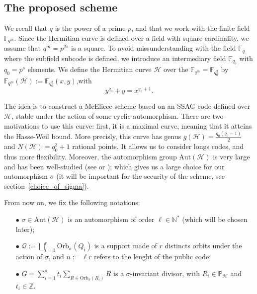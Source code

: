 \documentclass[10pt]{article}
\theoremstyle{definition}
\theoremstyle{definition}
\theoremstyle{definition}
\newcommand{\N}{\mathbb{N}}
\newcommand{\Z}{\mathbb{Z}}
\newcommand{\PP}{\mathbb{P}}
\newcommand{\calH}{\mathcal{H}}
\newcommand{\Fqm}{\mathbb{F}_{q^m}}
\newcommand{\Fq}{\mathbb{F}_q}
\newcommand{\QR}{\mathcal{Q}}
\begin{document}
\subsection{The proposed scheme}


We recall that $q$ is the power of a prime $p$, and that we work with the finite field $\Fqm$. Since the Hermitian curve is defined over a field with square cardinality, we assume that $q^m = p^{2s}$ is a square. To avoid missunderstanding with the field $\Fq$  where the subfield subcode is defined, we introduce an intermediary field $\mathbb{F}_{q_0}$ with $q_0 = p^s$ elements.   
We define the Hermitian curve $\calH$ over the $\Fqm = \mathbb{F}_{q_0^2}$ by \\ $\Fqm(\calH):=\mathbb{F}_{q_0^2}(x,y)$,with 
\begin{equation} \label{hermi}
y^{q_0}+y=x^{q_0+1}.
\end{equation}


The idea is to construct a McEliece scheme based on an SSAG code defined over $\calH$, stable under the action of some cyclic automorphism. There are two motivations to use this curve: first, it is a maximal curve,  meaning that it atteins the Hasse-Weil bound. More precisly, this curve has genus $g(\calH)= \frac{q_0(q_0-1)}{2}$ and $N(\calH)=q_0^3+1$ rational points. It allows us to consider longs codes, and thus more flexibility. Moreover, the automorphism group $\mathrm{Aut}(\mathcal{H})$ is very large and has been well-studied (see \cite{Sti} or \cite{Gar}); which gives us a large choice for our automorphism $\sigma$ (it will be important for the security of the scheme, see section~\ref{choice_of_sigma}). 



 From now on, we fix the following notations: 
\begin{enumerate}
\item[$\bullet$] $\sigma \in \mathrm{Aut}(\calH)$ is an automorphism of order $\ell \in \N^*$ (which will be chosen later);
\item[$\bullet$] $\QR := \bigsqcup\limits_{i=1}^{r} \mathrm{Orb}_{\sigma}(Q_i)$ is a support made of $r$ distincts orbits under the action of $\sigma$, and $n:=\ell r$ refers to the lenght of the public code;
\item[$\bullet$] $G = \sum\limits_{i=1}^s t_i \sum\limits_{R \in \mathrm{Orb}_{\sigma}(R_i)} R$ is a $\sigma$-invariant divisor, with $R_i \in \PP_{\mathcal{H}}$ and $t_i \in \Z$. 
\end{enumerate}
\end{document}
